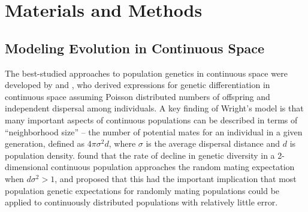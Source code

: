 \documentclass[11pt,twoside,lineno]{preprint}
\newif\ifcomments
\newcommand{\cjb}[1]{\ifcomments{{\color{orange} \it (#1)}}\else{}\fi}
\newcommand{\plr}[1]{\ifcomments{{\color{purple} \it (#1)}}\else{}\fi}
\newcommand{\ak}[1]{\ifcomments{{\color{red} \it (#1)}}\else{}\fi}
\begin{document}
\ak{I think we can cut the following paragraph if we just add the last sentence above} 
\cjb{agree - commenting out}


\section{Materials and Methods}
\label{sec:materials:methods}

\subsection{Modeling Evolution in Continuous Space}

\plr{PETER TO REVISIT THIS SECTION}

The best-studied approaches to population genetics in continuous space were developed by \cite{Wright1942,Wright1943} and \cite{Malecot1948}, who derived expressions for genetic differentiation in continuous space assuming Poisson distributed numbers of offspring and independent dispersal among individuals. A key finding of Wright's model is that many important aspects of continuous populations can be described in terms of ``neighborhood size'' -- the number of potential mates for an individual in a given generation, defined as $4\pi\sigma^2d$, where $\sigma$ is the average dispersal distance and $d$ is population density. \cite{Maruyama1972} found that the rate of decline in genetic diversity in a 2-dimensional continuous population approaches the random mating expectation when $d\sigma^2 > 1$, and proposed that this had the important implication that most population genetic expectations for randomly mating populations could be applied to continuously distributed populations with relatively little error. 
\end{document}
